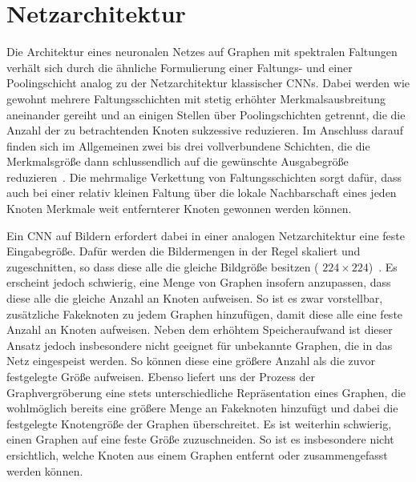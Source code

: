 \section{Netzarchitektur}
\label{spektrale_netzarchitektur}

Die Architektur eines neuronalen Netzes auf Graphen mit spektralen Faltungen verhält sich durch die ähnliche Formulierung einer Faltungs- und einer Poo\-ling\-sch\-icht analog zu der Netzarchitektur klassischer \glspl{CNN}.
Dabei werden wie gewohnt mehrere Faltungsschichten mit stetig erhöhter Merkmalsausbreitung aneinander gereiht und an einigen Stellen über Poolingschichten getrennt, die die Anzahl der zu betrachtenden Knoten sukzessive reduzieren.
Im Anschluss darauf finden sich im Allgemeinen zwei bis drei vollverbundene Schichten, die die Merkmalsgröße dann schlussendlich auf die gewünschte Ausgabegröße reduzieren~\cite{Nielsen}.
Die mehrmalige Verkettung von Faltungsschichten sorgt dafür, dass auch bei einer relativ kleinen Faltung über die lokale Nachbarschaft eines jeden Knoten Merkmale weit entfernterer Knoten gewonnen werden können.

Ein \gls{CNN} auf Bildern erfordert dabei in einer analogen Netzarchitektur eine feste Eingabegröße.
Dafür werden die Bildermengen in der Regel skaliert und zugeschnitten, so dass diese alle die gleiche Bildgröße besitzen (\zB{} $224 \times 224$)~\cite{spp}.
Es erscheint jedoch schwierig, eine Menge von Graphen insofern anzupassen, dass diese alle die gleiche Anzahl an Knoten aufweisen.
So ist es zwar vorstellbar, zusätzliche Fakeknoten zu jedem Graphen hinzufügen, damit diese alle eine feste Anzahl an Knoten aufweisen.
Neben dem erhöhtem Speicheraufwand ist dieser Ansatz jedoch insbesondere nicht geeignet für unbekannte Graphen, die in das Netz eingespeist werden.
So können diese \evtl{} eine größere Anzahl als die zuvor festgelegte Größe aufweisen.
Ebenso liefert uns der Prozess der Graphvergröberung eine stets unterschiedliche Repräsentation eines Graphen, die wohlmöglich bereits eine größere Menge an Fakeknoten hinzufügt und dabei die festgelegte Knotengröße der Graphen überschreitet.
Es ist weiterhin schwierig, einen Graphen auf eine feste Größe zuzuschneiden.
So ist es insbesondere nicht ersichtlich, welche Knoten aus einem Graphen entfernt oder zusammengefasst werden können.

